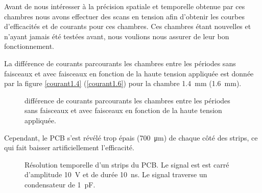 Avant de nous intéresser à la précision spatiale et temporelle obtenue par ces chambres nous avons effectuer des scans en tension afin d'obtenir les courbes d'efficacités et de courants pour ces chambres. Ces chambres étant nouvelles et n'ayant jamais été testées avant, nous voulions nous assurer de leur bon fonctionnement.

La différence de courants parcourants les chambres entre les périodes sans faisceaux et avec faisceaux en fonction de la haute tension appliquée est donnée par la figure \ref{courant1.4} (\ref{courant1.6}) pour la chambre \SI{1.4}{\milli\meter} (\SI{1.6}{\milli\meter}).

\begin{figure}[ht!]
	\vspace{-0.5cm}
	\centering
	\caption{différence de courants parcourants les chambres entre les périodes sans faisceaux et avec faisceaux en fonction de la haute tension appliquée.}
	\label{courant1.41.6}
\end{figure}


Cependant, le PCB s'est révélé trop épais (\SI{700}{\micro\meter}) de chaque côté des strips, ce qui fait baisser artificiellement l'efficacité.

\begin{figure}[!ht]
	\centering
	\caption{Résolution temporelle d'un strips du PCB. Le signal est est carré d'amplitude \SI{10}{\volt} et de durée \SI{10}{\nano\second}. Le signal traverse un condensateur de \SI{1}{\pico\farad}.}
	\label{Fit}
\end{figure}